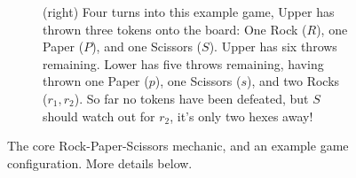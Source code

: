 \documentclass[]{article}
\newcommand{\uptoken}[3] {
    \node[draw,circle,minimum size=6.8mm,fill=white] at (#1, #2) {};
    \node[draw,circle,minimum size=5.2mm,very thick,black]  at (#1, #2) {};
    \node[] at (#1, #2) {#3};
}
\newcommand{\lotoken}[3] {
    \node[draw,circle,minimum size=6.8mm,fill=white] at (#1, #2) {};
    \node[draw,circle,minimum size=5.2mm,very thick,purple] at (#1, #2) {};
    \node[] at (#1, #2) {#3};
}
\newcommand{\board} {
    \tikzset{
        hex/.style={
            regular polygon,
            regular polygon sides=6,
            minimum size=10mm,
            inner sep=0mm,
            outer sep=0mm,
            rotate=30,
            draw
        },
        x={(4.33mm,7.5mm)},
        y={(8.66mm,0mm)}
    }
    \foreach \r/\q in {
                    +4/-4,+4/-3,+4/-2,+4/-1,+4/+0,
                 +3/-4,+3/-3,+3/-2,+3/-1,+3/+0,+3/+1,
              +2/-4,+2/-3,+2/-2,+2/-1,+2/+0,+2/+1,+2/+2,
           +1/-4,+1/-3,+1/-2,+1/-1,+1/+0,+1/+1,+1/+2,+1/+3,
        +0/-4,+0/-3,+0/-2,+0/-1,+0/+0,+0/+1,+0/+2,+0/+3,+0/+4,
           -1/-3,-1/-2,-1/-1,-1/+0,-1/+1,-1/+2,-1/+3,-1/+4,
              -2/-2,-2/-1,-2/+0,-2/+1,-2/+2,-2/+3,-2/+4,
                 -3/-1,-3/+0,-3/+1,-3/+2,-3/+3,-3/+4,
                    -4/+0,-4/+1,-4/+2,-4/+3,-4/+4,
    }
        \node[hex,fill=black!5] at (\r, \q) {};
}
\begin{document}
\begin{figure}[ht!]
\centering
\begin{subfigure}{.38\textwidth}
    \centering
    \caption{\label{fig:rps} (above)
        Rock-Paper-Scissors mechanic:
        Rock defeats Scissors,
        Scissors defeats Paper, and
        Paper defeats Rock.
    }
    \caption{
        \label{fig:example} (right)
        Four turns into this example game, Upper has thrown three
        tokens onto the board:
        One Rock ($R$), one Paper ($P$), and one Scissors ($S$).
        Upper has six throws remaining.
        Lower has five throws remaining, having thrown one Paper ($p$),
        one Scissors ($s$), and two Rocks ($r_1, r_2$).
        So far no tokens have been defeated, but $S$ should watch out for
        $r_2$, it's only two hexes away!
    }
\end{subfigure}
\begin{subfigure}{.01\textwidth}\end{subfigure}
\begin{subfigure}{.60\textwidth}
    \centering
\end{subfigure}
\caption{
    The core Rock-Paper-Scissors mechanic, and an example game configuration.
    More details below.
}
\end{figure}
\end{document}
